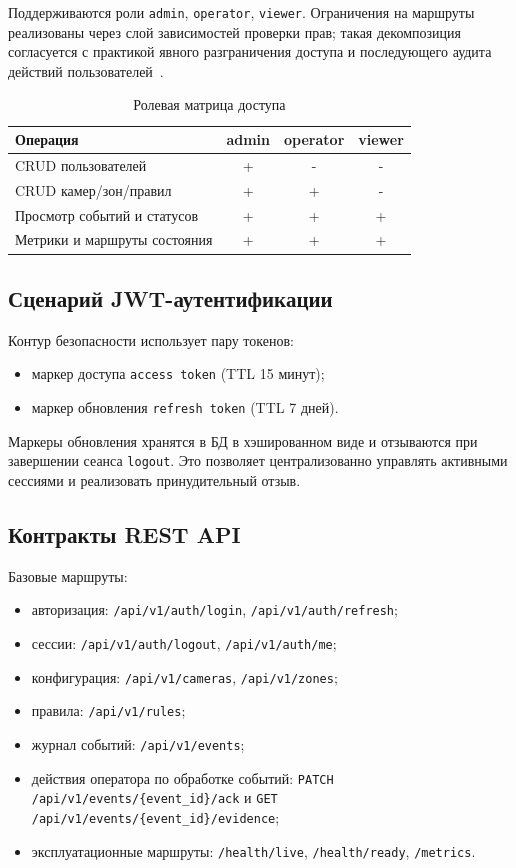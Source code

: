Поддерживаются роли \texttt{admin}, \texttt{operator}, \texttt{viewer}. Ограничения на маршруты реализованы через слой зависимостей проверки прав; такая декомпозиция согласуется с практикой явного разграничения доступа и последующего аудита действий пользователей~\cite{nist_sp800_53r5}.

\begin{table}[H]
\caption{Ролевая матрица доступа}
\label{tab:rbac_matrix}
\begin{tabularx}{\textwidth}{>{\raggedright\arraybackslash}p{}ccc}
\toprule
Операция & admin & operator & viewer \\
\midrule
CRUD пользователей & + & - & - \\
CRUD камер/зон/правил & + & + & - \\
Просмотр событий и статусов & + & + & + \\
Метрики и маршруты состояния & + & + & + \\
\bottomrule
\end{tabularx}
\end{table}

\subsection{Сценарий JWT-аутентификации}

Контур безопасности использует пару токенов:
\begin{itemize}
    \item маркер доступа \texttt{access token} (TTL 15 минут);
    \item маркер обновления \texttt{refresh token} (TTL 7 дней).
\end{itemize}

Маркеры обновления хранятся в БД в хэшированном виде и отзываются при завершении сеанса \texttt{logout}. Это позволяет централизованно управлять активными сессиями и реализовать принудительный отзыв.

\subsection{Контракты REST API}

Базовые маршруты:
\begin{itemize}
    \item авторизация: \texttt{/api/v1/auth/login}, \texttt{/api/v1/auth/refresh};
    \item сессии: \texttt{/api/v1/auth/logout}, \texttt{/api/v1/auth/me};
    \item конфигурация: \texttt{/api/v1/cameras}, \texttt{/api/v1/zones};
    \item правила: \texttt{/api/v1/rules};
    \item журнал событий: \texttt{/api/v1/events};
    \item действия оператора по обработке событий: \nolinkurl{PATCH /api/v1/events/{event_id}/ack} и \nolinkurl{GET /api/v1/events/{event_id}/evidence};
    \item эксплуатационные маршруты: \texttt{/health/live}, \texttt{/health/ready}, \texttt{/metrics}.
\end{itemize}

